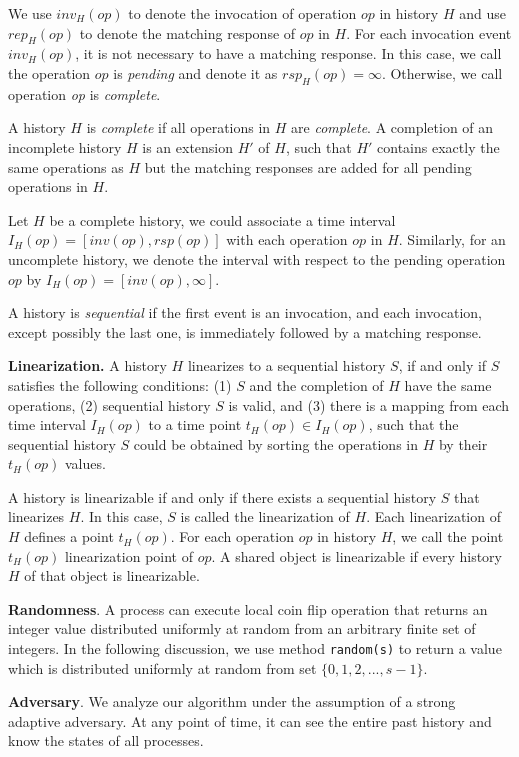 We use $inv_H(op)$ to denote the invocation of operation $op$ in history $H$ and use $rep_H(op)$ to denote the matching response of $op$ in $H$. For each invocation event $inv_H(op)$, it is not necessary to have a matching response. In this case, we call the operation $op$ is \emph{pending} and denote it as $rsp_H(op) = \infty$. Otherwise, we call operation \emph{op} is \emph{complete}.

A history $H$ is \emph{complete} if all operations in $H$ are \emph{complete}. A completion of an incomplete history $H$ is an extension $H'$ of $H$, such that $H'$ contains exactly the same operations as $H$ but the matching responses are added for all pending operations in $H$.

Let $H$ be a complete history, we could associate a time interval $I_H(op) = [inv(op), rsp(op)]$ with each operation $op$ in $H$. Similarly, for an uncomplete history, we denote the interval with respect to the pending operation $op$ by $I_H(op) = [inv(op), \infty]$.

A history is \emph{sequential} if the first event is an invocation, and each invocation, except possibly the last one, is immediately followed by a matching response.


\textbf{Linearization.} A history $H$ linearizes to a sequential history $S$, if and only if $S$ satisfies the following conditions: (1) $S$ and the completion of $H$ have the same operations, (2) sequential history $S$ is valid, and (3) there is a mapping from each time interval $I_H(op)$ to a time point $t_H(op) \in I_H(op)$, such that the sequential history $S$ could be obtained by sorting the operations in $H$ by their $t_H(op)$ values.

A history is linearizable if and only if there exists a sequential history $S$ that linearizes $H$. In this case, $S$ is called the linearization of $H$. Each linearization of $H$ defines a point $t_H(op)$. For each operation $op$ in history $H$, we call the point $t_H(op)$ linearization point of $op$. A shared object is linearizable if every history $H$ of that object is linearizable.

\textbf{Randomness}. A process can execute local coin flip operation that returns an integer value distributed uniformly at random from an arbitrary finite set of integers. In the following discussion, we use method \texttt{random(s)} to return a value which is distributed uniformly at random from set $\{0, 1, 2,..., s-1\}$.

\textbf{Adversary}. We analyze our algorithm under the assumption of a strong adaptive adversary. At any point of time, it can see the entire past history and know the states of all processes.


